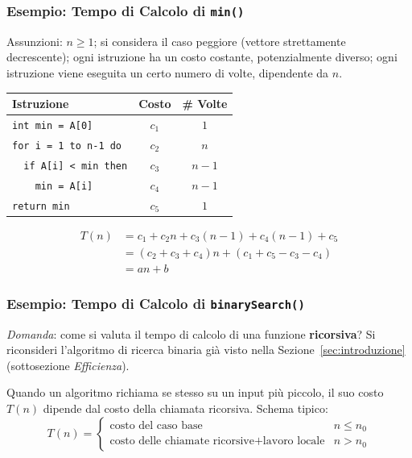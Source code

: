 \documentclass[12pt, a4paper]{article}
\begin{document}
\subsubsection{Esempio: Tempo di Calcolo di \texttt{min()}}

Assunzioni: $n \ge 1$; si considera il caso peggiore (vettore strettamente decrescente); ogni istruzione ha un costo costante, potenzialmente diverso; ogni istruzione viene eseguita un certo numero di volte, dipendente da $n$.

\begin{center}
\begin{tabular}{lcc}
\toprule
\textbf{Istruzione} & \textbf{Costo} & \textbf{\# Volte} \\
\midrule
\texttt{int min = A[0]} & $c_1$ & $1$ \\
\texttt{for i = 1 to n-1 do} & $c_2$ & $n$ \\
\texttt{\ \ if A[i] < min then} & $c_3$ & $n-1$ \\
\texttt{\ \ \ \ min = A[i]} & $c_4$ & $n-1$ \\
\texttt{return min} & $c_5$ & $1$ \\
\bottomrule
\end{tabular}
\end{center}

\begin{align*}
T(n) &= c_1 + c_2 n + c_3(n-1) + c_4(n-1) + c_5 \\
     &= (c_2+c_3+c_4)n + (c_1+c_5-c_3-c_4) \\
     &= an+b
\end{align*}

\subsubsection{Esempio: Tempo di Calcolo di \texttt{binarySearch()}}

\textit{Domanda}: come si valuta il tempo di calcolo di una funzione \textbf{ricorsiva}? Si riconsideri l'algoritmo di ricerca binaria già visto nella Sezione~\ref{sec:introduzione} (sottosezione \emph{Efficienza}).

\begin{tcolorbox}[colback=lightergray!10, colframe=tocsec, title=\textbf{Definizione: Relazione di Ricorrenza}]
\label{def:relazione-ricorrenza}
Quando un algoritmo richiama se stesso su un input più piccolo, il suo costo $T(n)$ dipende dal costo della chiamata ricorsiva. Schema tipico:
$$T(n) = \begin{cases} \text{costo del caso base} & n \le n_0 \\ \text{costo delle chiamate ricorsive} + \text{lavoro locale} & n > n_0 \end{cases}$$
\end{tcolorbox}
\end{document}
